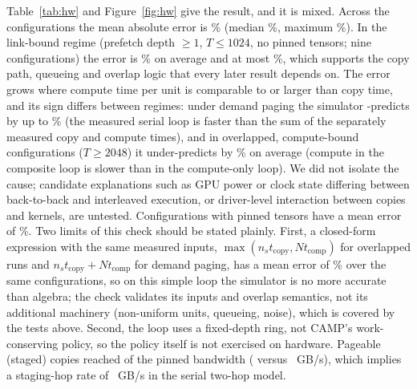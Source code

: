 \documentclass[preprint,12pt]{elsarticle}
\newcommand{\camp}{\textsc{CAMP}}
\begin{document}
Table~\ref{tab:hw} and Figure~\ref{fig:hw} give the result, and it is mixed. Across the \nHwN{} configurations the mean absolute error is \nHwMape\% (median \nHwMedian\%, maximum \nHwMax\%). In the link-bound regime (prefetch depth $\ge1$, $T\le1024$, no pinned tensors; nine configurations) the error is \nHwLinkBoundMape\% on average and at most \nHwLinkBoundMax\%, which supports the copy path, queueing and overlap logic that every later result depends on. The error grows where compute time per unit is comparable to or larger than copy time, and its sign differs between regimes: under demand paging the simulator \nHwDemandSign-predicts by up to \nHwDemandMax\% (the measured serial loop is faster than the sum of the separately measured copy and compute times), and in overlapped, compute-bound configurations ($T\ge2048$) it under-predicts by \nHwBigMean\% on average (compute in the composite loop is slower than in the compute-only loop). We did not isolate the cause; candidate explanations such as GPU power or clock state differing between back-to-back and interleaved execution, or driver-level interaction between copies and kernels, are untested. Configurations with pinned tensors have a mean error of \nHwPinnedMape\%. Two limits of this check should be stated plainly. First, a closed-form expression with the same measured inputs, $\max(n_s t_{\mathrm{copy}},N t_{\mathrm{comp}})$ for overlapped runs and $n_s t_{\mathrm{copy}}+N t_{\mathrm{comp}}$ for demand paging, has a mean error of \nHwCfMape\% over the same configurations, so on this simple loop the simulator is no more accurate than algebra; the check validates its inputs and overlap semantics, not its additional machinery (non-uniform units, queueing, noise), which is covered by the tests above. Second, the loop uses a fixed-depth ring, not \camp's work-conserving policy, so the policy itself is not exercised on hardware. Pageable (staged) copies reached \nHwRatio{} of the pinned bandwidth (\nHwPageableBw{} versus \nHwPinnedBw~GB/s), which implies a staging-hop rate of \nHwStaging~GB/s in the serial two-hop model.
\end{document}

